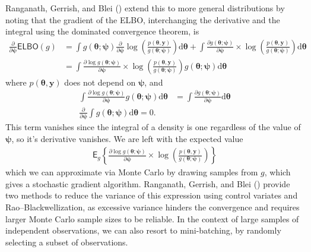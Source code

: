 \documentclass[
  11pt,
  letterpaper,
]{scrbook}
\theoremstyle{definition}
\theoremstyle{definition}
\theoremstyle{definition}
\theoremstyle{plain}
\theoremstyle{plain}
\theoremstyle{plain}
\theoremstyle{remark}
\begin{document}
Ranganath, Gerrish, and Blei ()
extend this to more general distributions by noting that the gradient of
the ELBO, interchanging the derivative and the integral using the
dominated convergence theorem, is \begin{align*}
\frac{\partial}{\partial \boldsymbol{\psi}} \mathsf{ELBO}(g) &= \int g(\boldsymbol{\theta}; \boldsymbol{\psi}) \frac{\partial}{\partial \boldsymbol{\psi}} \log \left( \frac{p(\boldsymbol{\theta}, \boldsymbol{y})}{g(\boldsymbol{\theta}; \boldsymbol{\psi})}\right) \mathrm{d} \boldsymbol{\theta} + \int  \frac{\partial g(\boldsymbol{\theta}; \boldsymbol{\psi})}{\partial \boldsymbol{\psi}} \times \log \left( \frac{p(\boldsymbol{\theta}, \boldsymbol{y})}{g(\boldsymbol{\theta}; \boldsymbol{\psi})}\right) \mathrm{d} \boldsymbol{\theta}
\\& = \int  \frac{\partial \log g(\boldsymbol{\theta}; \boldsymbol{\psi})}{\partial \boldsymbol{\psi}} \times \log \left( \frac{p(\boldsymbol{\theta}, \boldsymbol{y})}{g(\boldsymbol{\theta}; \boldsymbol{\psi})}\right) g(\boldsymbol{\theta}; \boldsymbol{\psi})\mathrm{d} \boldsymbol{\theta}
\end{align*} where \(p(\boldsymbol{\theta}, \boldsymbol{y})\) does not
depend on \(\boldsymbol{\psi}\), and \begin{align*}
\int \frac{\partial \log g(\boldsymbol{\theta}; \boldsymbol{\psi})}{\partial \boldsymbol{\psi}} g(\boldsymbol{\theta}; \boldsymbol{\psi}) \mathrm{d} \boldsymbol{\theta} & = \int \frac{\partial g(\boldsymbol{\theta}; \boldsymbol{\psi})}{\partial \boldsymbol{\psi}} \mathrm{d} \boldsymbol{\theta}  \\
\frac{\partial}{\partial \boldsymbol{\psi}}\int g(\boldsymbol{\theta}; \boldsymbol{\psi})  \mathrm{d} \boldsymbol{\theta} = 0.
\end{align*} This term vanishes since the integral of a density is one
regardless of the value of \(\boldsymbol{\psi}\), so it's derivative
vanishes. We are left with the expected value \begin{align*}
 \mathsf{E}_{g}\left\{\frac{\partial \log g(\boldsymbol{\theta}; \boldsymbol{\psi})}{\partial \boldsymbol{\psi}} \times \log \left( \frac{p(\boldsymbol{\theta}, \boldsymbol{y})}{g(\boldsymbol{\theta}; \boldsymbol{\psi})}\right)\right\}
\end{align*} which we can approximate via Monte Carlo by drawing samples
from \(g\), which gives a stochastic gradient algorithm. Ranganath,
Gerrish, and Blei () provide two
methods to reduce the variance of this expression using control variates
and Rao--Blackwellization, as excessive variance hinders the convergence
and requires larger Monte Carlo sample sizes to be reliable. In the
context of large samples of independent observations, we can also resort
to mini-batching, by randomly selecting a subset of observations.
\end{document}
